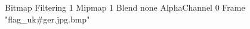 {Bitmap
	{Filtering 1}
	{Mipmap 1}
	{Blend none}
	{AlphaChannel 0}
	{Frame "flag_uk#ger.jpg.bmp"}
}
